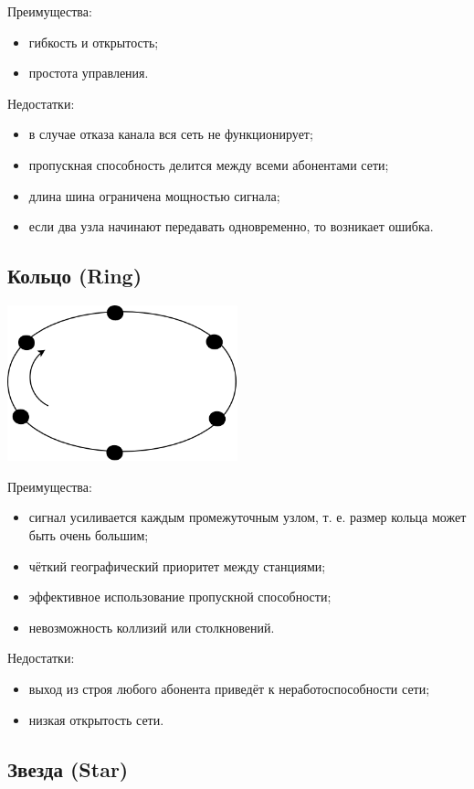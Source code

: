 \documentclass[12pt, russian, oneside, article]{ncc}
\begin{document}
Преимущества:
\begin{itemize}
\item гибкость и открытость;
\item простота управления.
\end{itemize}

Недостатки:
\begin{itemize}
\item в случае отказа канала вся сеть не функционирует;
\item пропускная способность делится между всеми абонентами сети;
\item длина шина ограничена мощностью сигнала;
\item если два узла начинают передавать одновременно, то возникает ошибка.
\end{itemize}
\subsection{Кольцо (Ring)}
\label{sec-2_2}


\includegraphics[width=0.5\textwidth]{images/SiSPI/ring.png}

Преимущества:
\begin{itemize}
\item сигнал усиливается каждым промежуточным узлом, т. е. размер кольца может быть очень большим;
\item чёткий географический приоритет между станциями;
\item эффективное использование пропускной способности;
\item невозможность коллизий или столкновений.
\end{itemize}

Недостатки:
\begin{itemize}
\item выход из строя любого абонента приведёт к неработоспособности сети;
\item низкая открытость сети.
\end{itemize}
\subsection{Звезда (Star)}
\label{sec-2_3}
\end{document}
